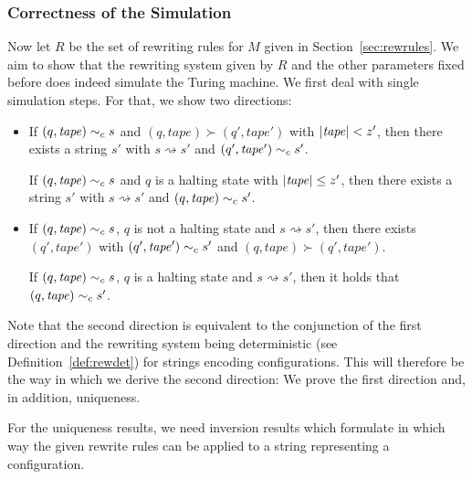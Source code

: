 \documentclass[a4paper,UKenglish,cleveref, autoref]{lipics-v2019}
\newcommand{\strent}{\rightsquigarrow}
\begin{document}
\subsubsection{Correctness of the Simulation}
Now let $R$ be the set of rewriting rules for $M$ given in Section~\ref{sec:rewrules}. We aim to show that the rewriting system given by $R$ and the other parameters fixed before does indeed simulate the Turing machine. We first deal with single simulation steps. For that, we show two directions:
\begin{itemize}
  \item If $(q, \mathit{tape}) \sim_c s$ and $(q, \mathit{tape}) \succ (q', \mathit{tape}')$ with $|\mathit{tape}| < z'$, then there exists a string $s'$ with $s \strent{} s'$ and $(q', \mathit{tape'}) \sim_c s'$. 

    If $(q, \mathit{tape}) \sim_c s$ and $q$ is a halting state with $|\mathit{tape}| \le z'$, then there exists a string $s'$ with $s \strent{} s'$ and $(q, \mathit{tape}) \sim_c s'$. 
  \item If $(q, \mathit{tape}) \sim_c s$, $q$ is not a halting state and $s \strent{} s'$, then there exists $(q', \mathit{tape}')$ with $(q', \mathit{tape}') \sim_c{} s'$ and $(q, \mathit{tape}) \succ (q', \mathit{tape'})$. 

    If $(q, \mathit{tape}) \sim_c s$, $q$ is a halting state and $s \strent{} s'$, then it holds that $(q, \mathit{tape}) \sim_c{} s'$. 
\end{itemize}

Note that the second direction is equivalent to the conjunction of the first direction and the rewriting system being deterministic (see Definition~\ref{def:rewdet}) for strings encoding configurations. This will therefore be the way in which we derive the second direction: We prove the first direction and, in addition, uniqueness.

For the uniqueness results, we need inversion results which formulate in which way the given rewrite rules can be applied to a string representing a configuration. 
\end{document}
